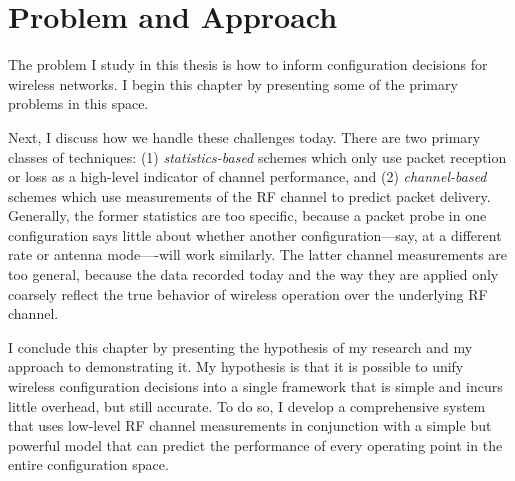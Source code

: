 \ifx\mainfile\undefined

\setcounter{chapter}{2} %
\fi

\cleardoublepage
\chapter{Problem and Approach}
\label{chap:problem}
\label{chap:approach}

The problem I study in this thesis is how to inform configuration decisions for wireless networks. I begin this chapter by presenting some of the primary problems in this space.

Next, I discuss how we handle these challenges today. There are two primary classes of techniques: (1) \emph{statistics-based} schemes which only use packet reception or loss as a high-level indicator of channel performance, and (2) \emph{channel-based} schemes which use measurements of the RF channel to predict packet delivery. Generally, the former statistics are too specific, because a packet probe in one configuration says little about whether another configuration---say, at a different rate or antenna mode----will work similarly. The latter channel measurements are too general, because the data recorded today and the way they are applied only coarsely reflect the true behavior of wireless operation over the underlying RF channel.

I conclude this chapter by presenting the hypothesis of my research and my approach to demonstrating it. My hypothesis is that it is possible to unify wireless configuration decisions into a single framework that is simple and incurs little overhead, but still accurate. To do so, I develop a comprehensive system that uses low-level RF channel measurements in conjunction with a simple but powerful model that can predict the performance of every operating point in the entire configuration space. 


%
